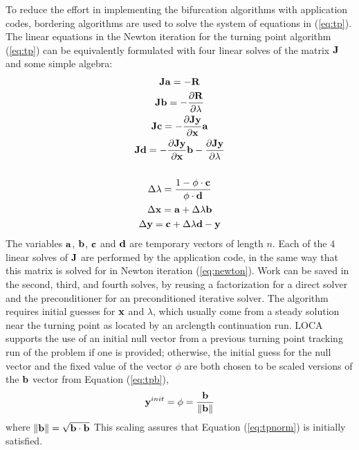 To reduce the effort in implementing the bifurcation algorithms with application codes, bordering algorithms are used to solve the system of equations in (\ref{eq:tp}). The linear equations in the Newton iteration for the turning point algorithm (\ref{eq:tp}) can be equivalently formulated with four linear solves of the matrix ${\bf J}$ and some simple algebra:
\begin{gather}
{\bf J} {\bf a} = -{\bf R} \label{eq:tpa}\\
{\bf J} {\bf b} = -\frac{\partial {\bf R}}{\partial \lambda} \label{eq:tpb}\\
{\bf J} {\bf c} = -\frac{\partial {\bf J} {\bf y}}{\partial {\bf x}} {\bf a} \label{eq:tpc}\\
{\bf J} {\bf d} = -\frac{\partial {\bf J} {\bf y}}{\partial {\bf x}} {\bf b} -  \frac{\partial {\bf J} {\bf y}}{\partial \lambda} \label{eq:tpd}\\
\nonumber \\
\Delta\lambda = {{1 - \phi \cdot {\bf c}}\over {\phi \cdot  {\bf d}}} \\
\Delta{\bf x} = {\bf a} + \Delta\lambda {\bf b} \\
\Delta{\bf y} = {\bf c} + \Delta\lambda {\bf d} - {\bf y}
\end{gather}
The variables ${\bf a}$, ${\bf b}$, ${\bf c}$ and ${\bf d}$ are temporary vectors of length $n$. Each of the $4$ linear solves of ${\bf J}$ are performed by the application code, in the same way that this matrix is solved for in Newton iteration (\ref{eq:newton}). Work can be saved in the second, third, and fourth solves, by reusing a factorization for a direct solver and the preconditioner for an preconditioned iterative solver. The algorithm requires initial guesses for ${\bf x}$ and $\lambda$, which usually come from a steady solution near the turning point as located by an arclength continuation run. LOCA supports the use of an initial null vector from a previous turning point tracking run of the problem if one is provided; otherwise, the initial guess for the null vector and the fixed value of the vector $\phi$ are both chosen to be
scaled versions of the ${\bf b}$ vector from Equation (\ref{eq:tpb}),
\begin{equation}
{\bf y}^{init} = \phi = {{\bf b} \over {\| {\bf b}\|}}
\end{equation}
where $\|{\bf b}\| = \sqrt{{\bf b} \cdot {\bf b}}$ This scaling assures that Equation (\ref{eq:tpnorm}) is initially satisfied.

